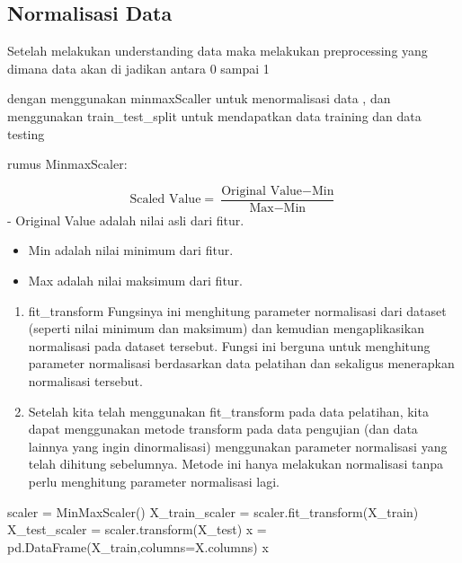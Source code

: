 \documentclass[
  letterpaper,
]{krantz}
\makeatletter
\newenvironment{Shaded}{\begin{snugshade}}{\end{snugshade}}
\newcommand{\NormalTok}[1]{\textcolor[rgb]{0.00,0.23,0.31}{#1}}
\newcommand{\OperatorTok}[1]{\textcolor[rgb]{0.37,0.37,0.37}{#1}}
\newenvironment{kframe}{%
\medskip{}
\setlength{\fboxsep}{.8em}
 \def\at@end@of@kframe{}%
 \ifinner\ifhmode%
  \def\at@end@of@kframe{\end{minipage}}%
  \begin{minipage}{\columnwidth}%
 \fi\fi%
 \def\FrameCommand##1{\hskip\@totalleftmargin \hskip-\fboxsep
 \colorbox{shadecolor}{##1}\hskip-\fboxsep
     \hskip-\linewidth \hskip-\@totalleftmargin \hskip\columnwidth}%
 \MakeFramed {\advance\hsize-\width
   \@totalleftmargin\z@ \linewidth\hsize
   \@setminipage}}%
 {\par\unskip\endMakeFramed%
 \at@end@of@kframe}
\renewenvironment{Shaded}{\begin{kframe}}{\end{kframe}}
\makeatother
\begin{document}
\hypertarget{normalisasi-data}{%
\subsection{Normalisasi Data}\label{normalisasi-data}}

Setelah melakukan understanding data maka melakukan preprocessing yang
dimana data akan di jadikan antara 0 sampai 1

dengan menggunakan minmaxScaller untuk menormalisasi data , dan
menggunakan train\_test\_split untuk mendapatkan data training dan data
testing

rumus MinmaxScaler:

\[
\text{Scaled Value} = \frac{\text{Original Value} - \text{Min}}{\text{Max} - \text{Min}}
\] - Original Value adalah nilai asli dari fitur.

\begin{itemize}
\item
  Min adalah nilai minimum dari fitur.
\item
  Max adalah nilai maksimum dari fitur.
\end{itemize}

\begin{enumerate}
\def\labelenumi{\arabic{enumi}.}
\item
  fit\_transform Fungsinya ini menghitung parameter normalisasi dari
  dataset (seperti nilai minimum dan maksimum) dan kemudian
  mengaplikasikan normalisasi pada dataset tersebut. Fungsi ini berguna
  untuk menghitung parameter normalisasi berdasarkan data pelatihan dan
  sekaligus menerapkan normalisasi tersebut.
\item
  Setelah kita telah menggunakan fit\_transform pada data pelatihan,
  kita dapat menggunakan metode transform pada data pengujian (dan data
  lainnya yang ingin dinormalisasi) menggunakan parameter normalisasi
  yang telah dihitung sebelumnya. Metode ini hanya melakukan normalisasi
  tanpa perlu menghitung parameter normalisasi lagi.
\end{enumerate}

\begin{Shaded}
\begin{Highlighting}[]
\NormalTok{scaler }\OperatorTok{=}\NormalTok{ MinMaxScaler()}
\NormalTok{X\_train\_scaler }\OperatorTok{=}\NormalTok{ scaler.fit\_transform(X\_train)}
\NormalTok{X\_test\_scaler }\OperatorTok{=}\NormalTok{ scaler.transform(X\_test)}
\NormalTok{x }\OperatorTok{=}\NormalTok{ pd.DataFrame(X\_train,columns}\OperatorTok{=}\NormalTok{X.columns)}
\NormalTok{x}
\end{Highlighting}
\end{Shaded}
\end{document}
